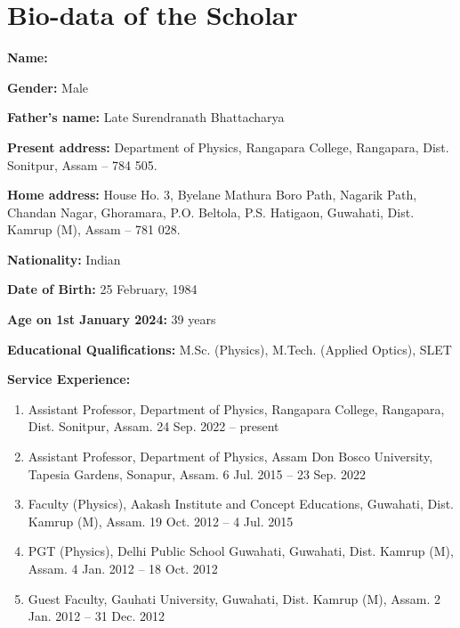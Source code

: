 \chapter{Bio-data of the Scholar} \label{appendix:biodata}

    \textbf{Name:} \authorname
    
    \textbf{Gender:} Male
    
    \textbf{Father’s name:} Late Surendranath Bhattacharya
    
    \textbf{Present address:} Department of Physics, Rangapara College, Rangapara, Dist. Sonitpur, Assam -- 784 505.
    
    \textbf{Home address:} House Ho. 3, Byelane Mathura Boro Path, Nagarik Path, Chandan Nagar, Ghoramara, P.O. Beltola, P.S. Hatigaon, Guwahati, Dist. Kamrup (M), Assam -- 781 028.
    
    \textbf{Nationality:} Indian
    
    \textbf{Date of Birth:} 25 February, 1984
    
    \textbf{Age on 1st January 2024:} 39 years
    
    \textbf{Educational Qualifications:} M.Sc. (Physics), M.Tech. (Applied Optics), SLET
    
    \textbf{Service Experience:} \vspace{-3ex}
    \begin{enumerate}
    	\item {Assistant Professor}, {Department of Physics}, {Rangapara College}, {Rangapara, Dist. Sonitpur, Assam}. {24 Sep. 2022 -- present}
    	\item {Assistant Professor}, {Department of Physics}, {Assam Don Bosco University}, {Tapesia Gardens, Sonapur, Assam}. {6 Jul. 2015 -- 23 Sep. 2022}
    	\item {Faculty (Physics)}, {Aakash Institute and Concept Educations}, {Guwahati, Dist. Kamrup (M), Assam}. {19 Oct. 2012 -- 4 Jul. 2015}
    	\item {PGT (Physics)}, {Delhi Public School Guwahati}, {Guwahati, Dist. Kamrup (M), Assam}. {4 Jan. 2012 -- 18 Oct. 2012}
    	\item {Guest Faculty}, {Gauhati University}, {Guwahati, Dist. Kamrup (M), Assam}. {2 Jan. 2012 -- 31 Dec. 2012}
    \end{enumerate}
